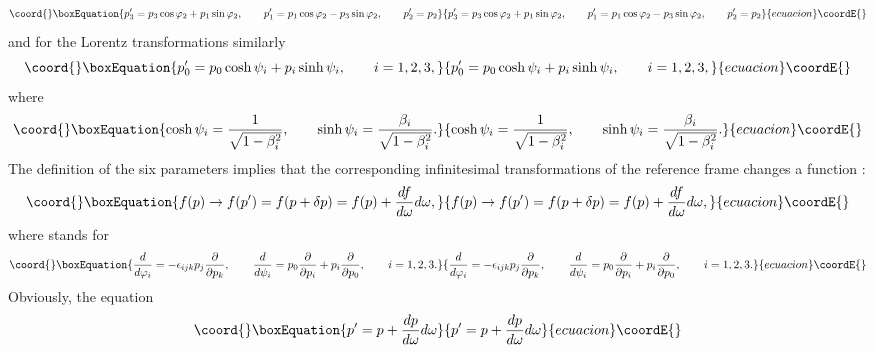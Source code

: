 \documentclass[a4paper,a4paper]{article}
\begin{document}
\begin{equation}\coord{}\boxEquation{
p_{3}^{\prime }=p_{3}\cos \varphi _{2}+p_{1}\sin \varphi _{2},\qquad
p_{1}^{\prime }=p_{1}\cos \varphi _{2}-p_{3}\sin \varphi _{2},\qquad
p_{2}^{\prime }=p_{2}  \label{sc10}
}{
p_{3}^{\prime }=p_{3}\cos \varphi _{2}+p_{1}\sin \varphi _{2},\qquad
p_{1}^{\prime }=p_{1}\cos \varphi _{2}-p_{3}\sin \varphi _{2},\qquad
p_{2}^{\prime }=p_{2}  }{ecuacion}\coordE{}\end{equation}%
and for the Lorentz transformations similarly 
\begin{equation}\coord{}\boxEquation{
p_{0}^{\prime }=p_{0}\cosh \psi _{i}+p_{i}\sinh \psi _{i},\qquad i=1,2,3,
\label{sd10}
}{
p_{0}^{\prime }=p_{0}\cosh \psi _{i}+p_{i}\sinh \psi _{i},\qquad i=1,2,3,
}{ecuacion}\coordE{}\end{equation}%
where 
\begin{equation}\coord{}\boxEquation{
\cosh \psi _{i}=\frac{1}{\sqrt{1-\beta _{i}^{2}}},\qquad \sinh \psi _{i}=
\frac{\beta _{i}}{\sqrt{1-\beta _{i}^{2}}}.  \label{se10}
}{
\cosh \psi _{i}=\frac{1}{\sqrt{1-\beta _{i}^{2}}},\qquad \sinh \psi _{i}=
\frac{\beta _{i}}{\sqrt{1-\beta _{i}^{2}}}.  }{ecuacion}\coordE{}\end{equation}%
The definition of the six parameters implies that the corresponding
infinitesimal transformations of the reference frame \coordHE{} changes a function \coordHE{} : 
\begin{equation}\coord{}\boxEquation{
f(p)\rightarrow f(p^{\prime })=f(p+\delta p)=f(p)+\frac{df}{d\omega }d\omega
,  \label{s11}
}{
f(p)\rightarrow f(p^{\prime })=f(p+\delta p)=f(p)+\frac{df}{d\omega }d\omega
,  }{ecuacion}\coordE{}\end{equation}%
where \coordHE{} stands for 
\begin{equation}\coord{}\boxEquation{
\frac{d}{d\varphi _{i}}=-\epsilon _{ijk}p_{j}\frac{\partial }{\partial p_{k}}
,\qquad \frac{d}{d\psi _{i}}=p_{0}\frac{\partial }{\partial p_{i}}+p_{i}
\frac{\partial }{\partial p_{0}},\qquad i=1,2,3.  \label{s12}
}{
\frac{d}{d\varphi _{i}}=-\epsilon _{ijk}p_{j}\frac{\partial }{\partial p_{k}}
,\qquad \frac{d}{d\psi _{i}}=p_{0}\frac{\partial }{\partial p_{i}}+p_{i}
\frac{\partial }{\partial p_{0}},\qquad i=1,2,3.  }{ecuacion}\coordE{}\end{equation}%
Obviously, the equation 
\begin{equation}\coord{}\boxEquation{
p^{\prime }=p+\frac{dp}{d\omega }d\omega  \label{s13}
}{
p^{\prime }=p+\frac{dp}{d\omega }d\omega  }{ecuacion}\coordE{}\end{equation}%
\end{document}
